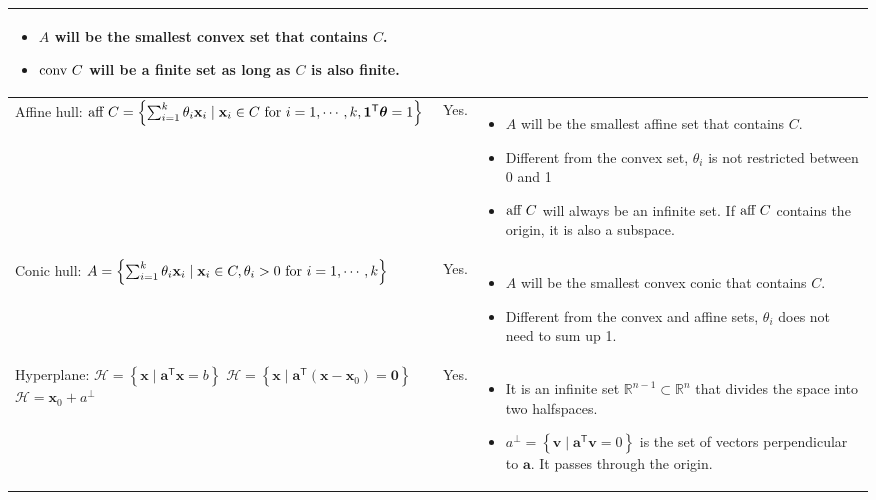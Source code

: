 \documentclass{article}
\newcommand{\trans}{\mathsf{T}}
\begin{document}
\begin{landscape}
\begin{table}
\begin{tabular}{|l|c|p{7cm}|}
\begin{itemize}[leftmargin=*]
            \item $A$ will be the smallest convex set that contains $C$.
            \item $\textnormal{conv } C$ will be a finite set as long as $C$ is also finite.
        \end{itemize} \\
        \hline
        \makecell{Affine hull: \\ $\textnormal{aff } C = \left\{ \sum_{i=1}^{k} \theta_i\mathbf{x}_i \mid \mathbf{x}_i \in C \textnormal{ for } i=1,\cdots, k, \mathbf{1}^\trans\boldsymbol{\theta} = 1  \right\}$} & Yes. & \begin{itemize}[leftmargin=*]
            \item $A$ will be the smallest affine set that contains $C$.
            \item Different from the convex set, \(\theta_i\) is not restricted between 0 and 1
            \item $\textnormal{aff } C$ will always be an infinite set. If $\textnormal{aff } C$ contains the origin, it is also a subspace.
        \end{itemize}\\
        \hline
        \makecell{Conic hull: \\ $A = \left\{ \sum_{i=1}^{k} \theta_i\mathbf{x}_i \mid \mathbf{x}_i \in C, \theta_i > 0 \textnormal{ for } i=1,\cdots, k \right\}$} & Yes. & \begin{itemize}[leftmargin=*]
            \item $A$ will be the smallest convex conic that contains $C$.
            \item Different from the convex and affine sets, \(\theta_i\) does not need to sum up 1.
        \end{itemize} \\
        \hline
        \makecell{Hyperplane: \\ \( \mathcal{H} = \left\{ \mathbf{x} \mid \mathbf{a}^\trans \mathbf{x} = b \right\}\) \\ \(\mathcal{H} = \left\{ \mathbf{x} \mid \mathbf{a}^\trans (\mathbf{x} - \mathbf{x}_{0}) = \mathbf{0} \right\}\) \\ \(\mathcal{H} = \mathbf{x}_0 + a^{\perp} \) } & Yes. & \begin{itemize}[leftmargin=*]
            \item It is an infinite set \(\mathbb{R}^{n-1} \subset \mathbb{R}^{n}\) that divides the space into two halfspaces.
            \item \(a^{\perp} = \left\{ \mathbf{v} \mid \mathbf{a}^\trans \mathbf{v} = 0 \right\}\) is the set of vectors perpendicular to \(\mathbf{a}\). It passes through the origin.

\end{itemize}
\end{tabular}
\end{table}
\end{landscape}
\end{document}
